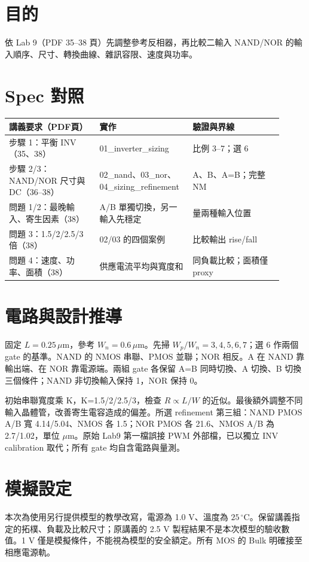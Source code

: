 \section{目的}
依 Lab 9（PDF 35--38 頁）先調整參考反相器，再比較二輸入 NAND/NOR 的輸入順序、尺寸、轉換曲線、雜訊容限、速度與功率。

\section{Spec 對照}
\begin{longtable}{p{0.31\linewidth}p{0.29\linewidth}p{0.31\linewidth}}
\toprule
講義要求（PDF頁） & 實作 & 驗證與界線 \\\midrule
步驟 1：平衡 INV（35、38） & 01\_inverter\_sizing & 比例 3--7；選 6 \\
步驟 2/3：NAND/NOR 尺寸與 DC（36--38） & 02\_nand、03\_nor、04\_sizing\_refinement & A、B、A=B；完整 NM \\
問題 1/2：最晚輸入、寄生因素（38） & A/B 單獨切換，另一輸入先穩定 & 量兩種輸入位置 \\
問題 3：1.5/2/2.5/3 倍（38） & 02/03 的四個案例 & 比較輸出 rise/fall \\
問題 4：速度、功率、面積（38） & 供應電流平均與寬度和 & 同負載比較；面積僅 proxy \\
\bottomrule
\end{longtable}


\section{電路與設計推導}
固定 $L=0.25\,\mu$m，參考 $W_n=0.6\,\mu$m。先掃 $W_p/W_n=3,4,5,6,7$；選 6 作兩個 gate 的基準。NAND 的 NMOS 串聯、PMOS 並聯；NOR 相反。A 在 NAND 靠輸出端、在 NOR 靠電源端。兩組 gate 各保留 A=B 同時切換、A 切換、B 切換三個條件；NAND 非切換輸入保持 1，NOR 保持 0。

初始串聯寬度乘 K，K=1.5/2/2.5/3，檢查 $R\propto L/W$ 的近似。最後額外調整不同輸入晶體管，改善寄生電容造成的偏差。所選 refinement 第三組：NAND PMOS A/B 寬 4.14/5.04、NMOS 各 1.5；NOR PMOS 各 21.6、NMOS A/B 為 2.7/1.02，單位 $\mu$m。原始 Lab9 第一檔誤接 PWM 外部檔，已以獨立 INV calibration 取代；所有 gate 均自含電路與量測。

\section{模擬設定}
本次為使用另行提供模型的教學改寫，電源為 1.0 V、溫度為 $25\,^{\circ}\mathrm C$。保留講義指定的拓樸、負載及比較尺寸；原講義的 2.5 V 製程結果不是本次模型的驗收數值。1 V 僅是模擬條件，不能視為模型的安全額定。所有 MOS 的 Bulk 明確接至相應電源軌。


